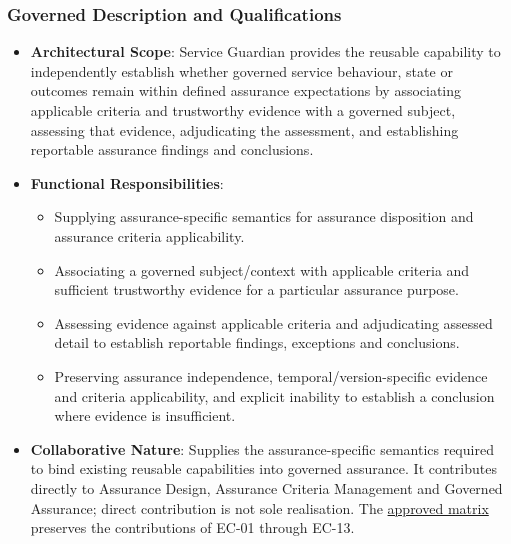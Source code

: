 \subsubsection*{Governed Description and Qualifications}

\begin{itemize}

\item
\textbf{Architectural Scope}: Service Guardian provides the reusable capability to independently establish whether governed service behaviour, state or outcomes remain within defined assurance expectations by associating applicable criteria and trustworthy evidence with a governed subject, assessing that evidence, adjudicating the assessment, and establishing reportable assurance findings and conclusions.



\item
\textbf{Functional Responsibilities}:


\begin{itemize}

\item
Supplying assurance-specific semantics for assurance disposition and assurance criteria applicability.



\item
Associating a governed subject/\allowbreak{}context with applicable criteria and sufficient trustworthy evidence for a particular assurance purpose.



\item
Assessing evidence against applicable criteria and adjudicating assessed detail to establish reportable findings, exceptions and conclusions.



\item
Preserving assurance independence, temporal/\allowbreak{}version-specific evidence and criteria applicability, and explicit inability to establish a conclusion where evidence is insufficient.



\end{itemize}


\item
\textbf{Collaborative Nature}: Supplies the assurance-specific semantics required to bind existing reusable capabilities into governed assurance. It contributes directly to Assurance Design, Assurance Criteria Management and Governed Assurance; direct contribution is not sole realisation. The \hyperref[rad:assurance-strategy:54]{approved matrix} preserves the contributions of EC-01 through EC-13.




\end{itemize}
